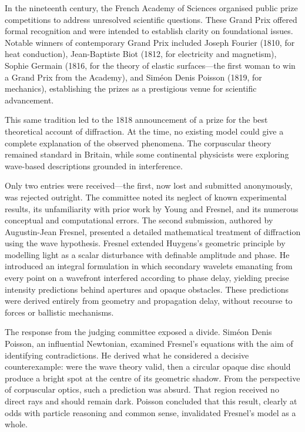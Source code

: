 In the nineteenth century, the French Academy of Sciences organised public prize competitions to address unresolved scientific questions. These Grand Prix offered formal recognition and were intended to establish clarity on foundational issues. Notable winners of contemporary Grand Prix included Joseph Fourier (1810, for heat conduction), Jean-Baptiste Biot (1812, for electricity and magnetism), Sophie Germain (1816, for the theory of elastic surfaces—the first woman to win a Grand Prix from the Academy), and Siméon Denis Poisson (1819, for mechanics), establishing the prizes as a prestigious venue for scientific advancement.

This same tradition led to the 1818 announcement of a prize for the best theoretical account of diffraction. At the time, no existing model could give a complete explanation of the observed phenomena. The corpuscular theory remained standard in Britain, while some continental physicists were exploring wave-based descriptions grounded in interference.

Only two entries were received—the first, now lost and submitted anonymously, was rejected outright. The committee noted its neglect of known experimental results, its unfamiliarity with prior work by Young and Fresnel, and its numerous conceptual and computational errors. The second submission, authored by Augustin-Jean Fresnel, presented a detailed mathematical treatment of diffraction using the wave hypothesis. Fresnel extended Huygens's geometric principle by modelling light as a scalar disturbance with definable amplitude and phase. He introduced an integral formulation in which secondary wavelets emanating from every point on a wavefront interfered according to phase delay, yielding precise intensity predictions behind apertures and opaque obstacles. These predictions were derived entirely from geometry and propagation delay, without recourse to forces or ballistic mechanisms.

The response from the judging committee exposed a divide. Siméon Denis Poisson, an influential Newtonian, examined Fresnel's equations with the aim of identifying contradictions. He derived what he considered a decisive counterexample: were the wave theory valid, then a circular opaque disc should produce a bright spot at the centre of its geometric shadow. From the perspective of corpuscular optics, such a prediction was absurd. That region received no direct rays and should remain dark. Poisson concluded that this result, clearly at odds with particle reasoning and common sense, invalidated Fresnel's model as a whole.

